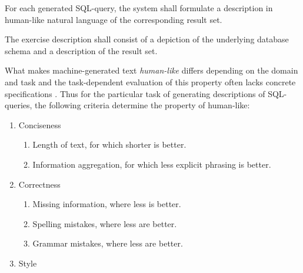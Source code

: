 For each generated SQL-query, the system shall formulate a description in human-like natural language of the corresponding result set.

The exercise description shall consist of a depiction of the underlying database schema and a description of the result set.

What makes machine-generated text \textit{human-like} differs depending on the domain and task and the task-dependent evaluation of this property often lacks concrete specifications \cite{Lee2021HumanEO, VANDERLEE2021101151}. Thus for the particular task of generating descriptions of SQL-queries, the following criteria determine the property of human-like:
\begin{enumerate}

 \item Conciseness
 \begin{enumerate}
    \item Length of text, for which shorter is better.
    \item Information aggregation, for which less explicit phrasing is better.
 \end{enumerate}
 
 \item Correctness
 \begin{enumerate}
    \item Missing information, where less is better.
    \item Spelling mistakes, where less are better.
    \item Grammar mistakes, where less are better.
 \end{enumerate}
 
 \item Style
 
\end{enumerate}



